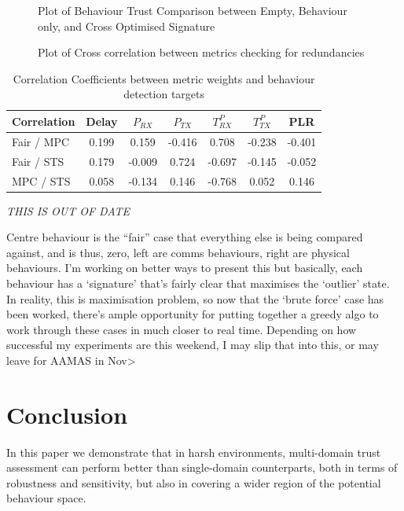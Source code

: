 \documentclass{aamas2016}
\begin{document}
\begin{figure}[h]
	\centering
	\caption{Plot of Behaviour Trust Comparison between Empty, Behaviour only, and Cross Optimised Signature}
	\label{fig:comms_trust_signature}
\end{figure}

\begin{figure}[h]
	\centering
	\caption{Plot of Cross correlation between metrics checking for redundancies}
	\label{fig:comms_trust_signature}
\end{figure}

\begin{table}[h]
	\caption{Correlation Coefficients between metric weights and behaviour detection targets} \label{tab:comms_correlations}
	\begin{center}
		\begin{tabular}{lcccccc}
			\hline
			Correlation      & Delay & $P_{RX}$ & $P_{TX}$ & $T^P_{RX}$ & $T^P_{TX}$ & PLR \\
			\hline
			Fair / MPC       & 0.199 &  0.159   & -0.416  &  0.708   & -0.238   & -0.401\\
			Fair / STS       & 0.179 &  -0.009  &  0.724  & -0.697   & -0.145   & -0.052\\
			MPC / STS        & 0.058 &  -0.134  &  0.146  & -0.768   &  0.052   &  0.146\\
			\hline
		\end{tabular}
	\end{center}
\end{table}\textit{THIS IS OUT OF DATE}

Centre behaviour is the “fair” case that everything else is being compared against, and is thus, zero, left are comms behaviours, right are physical behaviours. I’m working on better ways to present this but basically, each behaviour has a ‘signature’ that’s fairly clear that maximises the ‘outlier’ state. In reality, this is maximisation problem, so now that the ‘brute force’ case has been worked, there’s ample opportunity for putting together a greedy algo to work through these cases in much closer to real time. Depending on how successful my experiments are this weekend, I may slip that into this, or may leave for AAMAS in Nov> 


\section{Conclusion}
In this paper we demonstrate that in harsh environments, multi-domain trust assessment can perform better than single-domain counterparts, both in terms of robustness and sensitivity, but also in covering a wider region of the potential behaviour space. 
\end{document}
